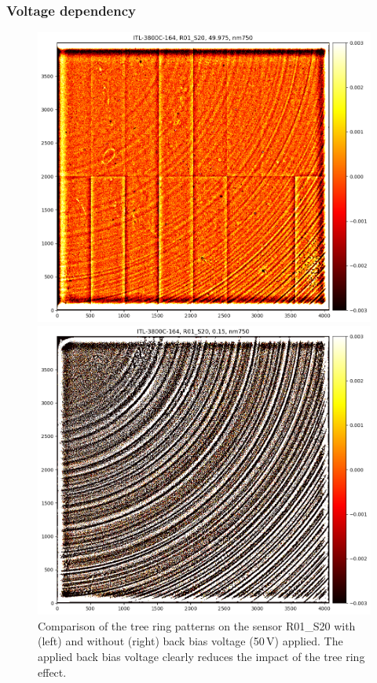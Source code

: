 \subsubsection{Voltage dependency}
\begin{figure}[ht]
\centering
\begin{minipage}[b]{0.45\textwidth}
\centering
\includegraphics[width=\textwidth]{figures/R01_S20_wBBV.png}
\end{minipage}
\begin{minipage}[b]{0.45\textwidth}
\centering
\includegraphics[width=\textwidth]{figures/R01_S20_woBBV.png}
\end{minipage}
\caption{Comparison of the tree ring patterns on the sensor R01\_S20 with (left) and without (right) back bias voltage (50\,V) applied.  The applied back bias voltage clearly reduces the impact of the tree ring effect.}
\end{figure}

